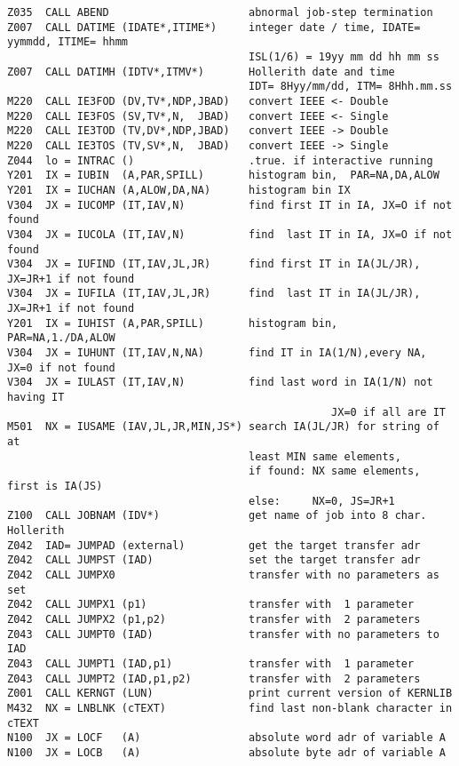 \begin{verbatim}
Z035  CALL ABEND                      abnormal job-step termination
Z007  CALL DATIME (IDATE*,ITIME*)     integer date / time, IDATE= yymmdd, ITIME= hhmm
                                      ISL(1/6) = 19yy mm dd hh mm ss
Z007  CALL DATIMH (IDTV*,ITMV*)       Hollerith date and time
                                      IDT= 8Hyy/mm/dd, ITM= 8Hhh.mm.ss
M220  CALL IE3FOD (DV,TV*,NDP,JBAD)   convert IEEE <- Double
M220  CALL IE3FOS (SV,TV*,N,  JBAD)   convert IEEE <- Single
M220  CALL IE3TOD (TV,DV*,NDP,JBAD)   convert IEEE -> Double
M220  CALL IE3TOS (TV,SV*,N,  JBAD)   convert IEEE -> Single
Z044  lo = INTRAC ()                  .true. if interactive running
Y201  IX = IUBIN  (A,PAR,SPILL)       histogram bin,  PAR=NA,DA,ALOW
Y201  IX = IUCHAN (A,ALOW,DA,NA)      histogram bin IX
V304  JX = IUCOMP (IT,IAV,N)          find first IT in IA, JX=O if not found
V304  JX = IUCOLA (IT,IAV,N)          find  last IT in IA, JX=O if not found
V304  JX = IUFIND (IT,IAV,JL,JR)      find first IT in IA(JL/JR), JX=JR+1 if not found
V304  JX = IUFILA (IT,IAV,JL,JR)      find  last IT in IA(JL/JR), JX=JR+1 if not found
Y201  IX = IUHIST (A,PAR,SPILL)       histogram bin,  PAR=NA,1./DA,ALOW
V304  JX = IUHUNT (IT,IAV,N,NA)       find IT in IA(1/N),every NA, JX=0 if not found
V304  JX = IULAST (IT,IAV,N)          find last word in IA(1/N) not having IT
                                                   JX=0 if all are IT
M501  NX = IUSAME (IAV,JL,JR,MIN,JS*) search IA(JL/JR) for string of at
                                      least MIN same elements,
                                      if found: NX same elements, first is IA(JS)
                                      else:     NX=0, JS=JR+1
Z100  CALL JOBNAM (IDV*)              get name of job into 8 char. Hollerith
Z042  IAD= JUMPAD (external)          get the target transfer adr
Z042  CALL JUMPST (IAD)               set the target transfer adr
Z042  CALL JUMPX0                     transfer with no parameters as set
Z042  CALL JUMPX1 (p1)                transfer with  1 parameter
Z042  CALL JUMPX2 (p1,p2)             transfer with  2 parameters
Z043  CALL JUMPT0 (IAD)               transfer with no parameters to IAD
Z043  CALL JUMPT1 (IAD,p1)            transfer with  1 parameter
Z043  CALL JUMPT2 (IAD,p1,p2)         transfer with  2 parameters
Z001  CALL KERNGT (LUN)               print current version of KERNLIB
M432  NX = LNBLNK (cTEXT)             find last non-blank character in cTEXT
N100  JX = LOCF   (A)                 absolute word adr of variable A
N100  JX = LOCB   (A)                 absolute byte adr of variable A

\end{verbatim}
